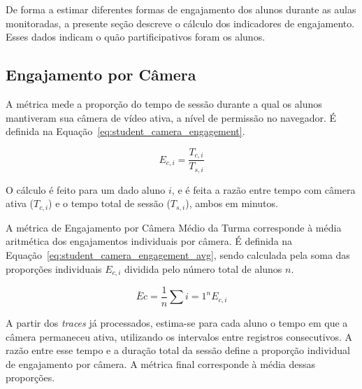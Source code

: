 De forma a estimar diferentes formas de engajamento dos alunos durante as aulas monitoradas, a presente seção descreve o cálculo dos indicadores de engajamento. Esses dados indicam o quão partificipativos foram os alunos.

\subsection{Engajamento por Câmera}
A métrica mede a proporção do tempo de sessão durante a qual os alunos mantiveram sua câmera de vídeo ativa, a nível de permissão no navegador. É definida na Equação~\ref{eq:student_camera_engagement}.

\begin{equation}\label{eq:student_camera_engagement}
E_{c,i} = \frac{T_{c,i}}{T_{s,i}}
\end{equation}

O cálculo é feito para um dado aluno $i$, e é feita a razão entre tempo com câmera ativa ($T_{c,i}$) e o tempo total de sessão ($T_{s,i}$), ambos em minutos.

A métrica de Engajamento por Câmera Médio da Turma corresponde à média aritmética dos engajamentos individuais por câmera. É definida na Equação~\ref{eq:student_camera_engagement_avg}, sendo calculada pela soma das proporções individuais $E_{c,i}$ dividida pelo número total de alunos $n$.

% 

\begin{equation}\label{eq:student_camera_engagement_avg}
\bar{E}c = \frac{1}{n} \sum{i=1}^{n} E_{c,i}
\end{equation}

A partir dos \textit{traces} já processados, estima-se para cada aluno o tempo em que a câmera permaneceu ativa, utilizando os intervalos entre registros consecutivos. A razão entre esse tempo e a duração total da sessão define a proporção individual de engajamento por câmera. A métrica final corresponde à média dessas proporções.



